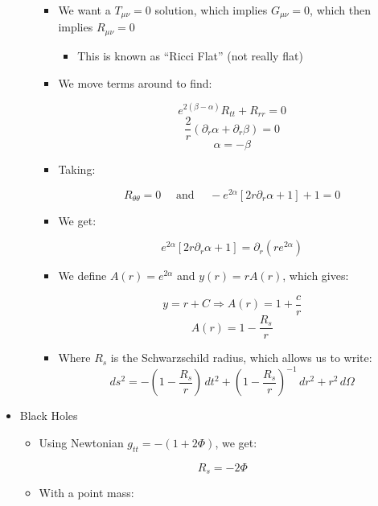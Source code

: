 \begin{itemize}
\begin{itemize}
\begin{itemize}
          \item We want a $T_{\mu\nu}=0$ solution, which implies $G_{\mu\nu}=0$, which then implies $R_{\mu\nu}=0$

            \begin{itemize}

              \item This is known as ``Ricci Flat'' (not really flat)

            \end{itemize}

          \item We move terms around to find:

            $$e^{2(\beta-\alpha)}R_{tt}+R_{rr}=0$$
            $$\frac{2}{r}\left( \partial_r\alpha+\partial_r\beta \right)=0$$
            $$\alpha=-\beta$$

          \item Taking:

            $$R_{\theta\theta}=0\quad\text{ and }\quad -e^{2\alpha}\left[ 2r\partial_r\alpha+1 \right]+1=0$$

          \item We get:

            $$e^{2\alpha}\left[ 2r\partial_r\alpha+1 \right]=\partial_r(re^{2\alpha})$$

          \item We define $A(r)=e^{2\alpha}$ and $y(r)=rA(r)$, which gives:

            $$y=r+C\Rightarrow A(r)=1+\frac{c}{r}$$
            $$A(r)=1-\frac{R_s}{r}$$

          \item Where $R_s$ is the Schwarzschild radius, which allows us to write:
            $$ds^2=-\left( 1-\frac{R_s}{r} \right)\,dt^2+\left( 1-\frac{R_s}{r} \right)^{-1}\,dr^2+r^2\,d\Omega$$

        \end{itemize}

    \end{itemize}

  \item Black Holes

    \begin{itemize}

      \item Using Newtonian $g_{tt}=-(1+2\Phi)$, we get:

        $$R_s=-2\Phi$$

      \item With a point mass:


\end{itemize}
\end{itemize}
